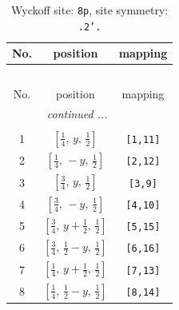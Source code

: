 \documentclass[fleqn,8pt]{jsarticle}
\begin{document}
\begin{longtable}{ccc}
\caption{Wyckoff site: {\tt 8p}, site symmetry: {\tt .2'.}}
 \\
 \hline \hline
No. & position & mapping \\ \hline \endfirsthead

\multicolumn{2}{l}{\tablename\ \thetable{}} \\
 \hline \hline
No. & position & mapping \\ \hline \endhead

 \hline \hline
\multicolumn{2}{r}{\footnotesize\it continued ...} \\ \endfoot

 \hline \hline
\multicolumn{2}{r}{} \\ \endlastfoot

1 & $\left[ \frac{1}{4},\, y,\, \frac{1}{2} \right]$ & {\tt [1,11]} \\ \hline
2 & $\left[ \frac{1}{4},\, - y,\, \frac{1}{2} \right]$ & {\tt [2,12]} \\ \hline
3 & $\left[ \frac{3}{4},\, y,\, \frac{1}{2} \right]$ & {\tt [3,9]} \\ \hline
4 & $\left[ \frac{3}{4},\, - y,\, \frac{1}{2} \right]$ & {\tt [4,10]} \\ \hline
5 & $\left[ \frac{3}{4},\, y + \frac{1}{2},\, \frac{1}{2} \right]$ & {\tt [5,15]} \\ \hline
6 & $\left[ \frac{3}{4},\, \frac{1}{2} - y,\, \frac{1}{2} \right]$ & {\tt [6,16]} \\ \hline
7 & $\left[ \frac{1}{4},\, y + \frac{1}{2},\, \frac{1}{2} \right]$ & {\tt [7,13]} \\ \hline
8 & $\left[ \frac{1}{4},\, \frac{1}{2} - y,\, \frac{1}{2} \right]$ & {\tt [8,14]} \\
\end{longtable}
\renewcommand{\arraystretch}{1.2}
\end{document}
